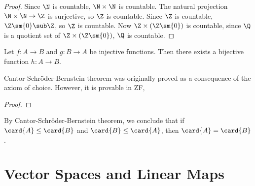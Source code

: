 \documentclass[10pt]{article}
\begin{document}
\begin{proof}
    Since $\N$ is countable, $\N\times\N$ is countable. The natural projection $\N\times\N\to\Z$ is surjective, so $\Z$ is countable. Since $\Z$ is countable, $\Z\sm\{0\}\sub\Z$, so $\Z$ is countable. Now $\Z\times(\Z\sm\{0\})$ is countable, since $\Q$ is a quotient set of $\Z\times(\Z\sm\{0\})$, $\Q$ is countable.
\end{proof}
\begin{theorem}
    Let $f:A\to B$ and $g:B\to A$ be injective functions. Then there exists a bijective function $h:A\to B$.
\end{theorem}
\begin{remark}
    Cantor-Schröder-Bernstein theorem was originally proved as a consequence of the axiom of choice. However, it is provable in ZF, 
\end{remark}
\begin{proof}
    
\end{proof}
\par
By Cantor-Schröder-Bernstein theorem, we conclude that if $\card{A}\le\card{B}$ and $\card{B}\le\card{A}$, then $\card{A}=\card{B}$.
\newpage
\section{Vector Spaces and Linear Maps}

\newpage
\end{document}
